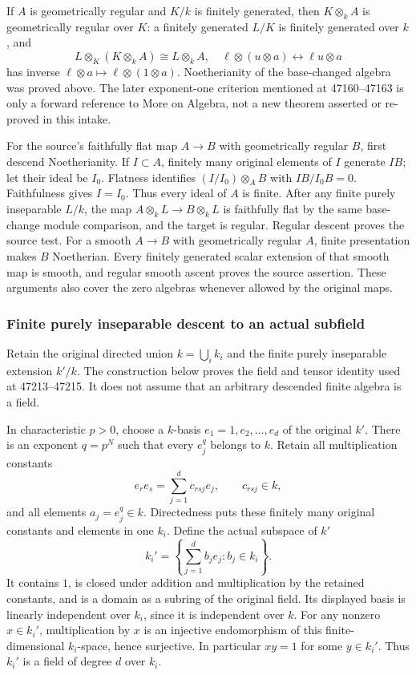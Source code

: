 If \(A\) is geometrically regular and \(K/k\) is finitely generated, then \(K\otimes_kA\) is geometrically regular over \(K\): a finitely generated \(L/K\) is finitely generated over \(k\), and \[
 L\otimes_K(K\otimes_kA)\cong L\otimes_kA,
 \quad \ell\otimes(u\otimes a)\longleftrightarrow\ell u\otimes a
\] has inverse \(\ell\otimes a\mapsto\ell\otimes(1\otimes a)\). Noetherianity of the base-changed algebra was proved above. The later exponent-one criterion mentioned at 47160--47163 is only a forward reference to More on Algebra, not a new theorem asserted or re-proved in this intake.

For the source's faithfully flat map \(A\to B\) with geometrically regular \(B\), first descend Noetherianity. If \(I\subset A\), finitely many original elements of \(I\) generate \(IB\); let their ideal be \(I_0\). Flatness identifies \((I/I_0)\otimes_AB\) with \(IB/I_0B=0\). Faithfulness gives \(I=I_0\). Thus every ideal of \(A\) is finite. After any finite purely inseparable \(L/k\), the map \(A\otimes_kL\to B\otimes_kL\) is faithfully flat by the same base-change module comparison, and the target is regular. Regular descent proves the source test. For a smooth \(A\to B\) with geometrically regular \(A\), finite presentation makes \(B\) Noetherian. Every finitely generated scalar extension of that smooth map is smooth, and regular smooth ascent proves the source assertion. These arguments also cover the zero algebras whenever allowed by the original maps.

\subsubsection{Finite purely inseparable descent to an actual subfield}\label{algebra-proof-071-finite-purely-inseparable-descent-to-an-actual-subfield}

Retain the original directed union \(k=\bigcup_i k_i\) and the finite purely inseparable extension \(k'/k\). The construction below proves the field and tensor identity used at 47213--47215. It does not assume that an arbitrary descended finite algebra is a field.

In characteristic \(p>0\), choose a \(k\)-basis \(e_1=1,e_2,\ldots,e_d\) of the original \(k'\). There is an exponent \(q=p^N\) such that every \(e_j^q\) belongs to \(k\). Retain all multiplication constants \[
 e_re_s=\sum_{j=1}^d c_{rsj}e_j,\qquad c_{rsj}\in k,
\] and all elements \(a_j=e_j^q\in k\). Directedness puts these finitely many original constants and elements in one \(k_i\). Define the actual subspace of \(k'\) \[
 k_i'=\left\{\sum_{j=1}^d b_je_j:b_j\in k_i\right\}.
\] It contains \(1\), is closed under addition and multiplication by the retained constants, and is a domain as a subring of the original field. Its displayed basis is linearly independent over \(k_i\), since it is independent over \(k\). For any nonzero \(x\in k_i'\), multiplication by \(x\) is an injective endomorphism of this finite-dimensional \(k_i\)-space, hence surjective. In particular \(xy=1\) for some \(y\in k_i'\). Thus \(k_i'\) is a field of degree \(d\) over \(k_i\).

